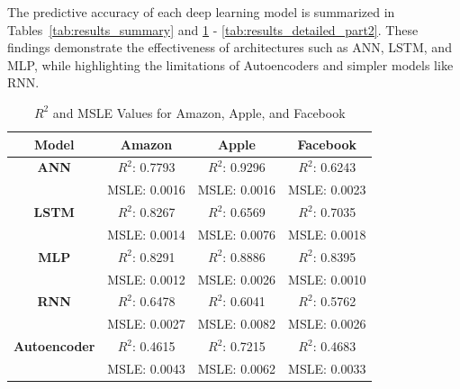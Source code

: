 \documentclass[conference]{IEEEtran}
\begin{document}
The predictive accuracy of each deep learning model is summarized in Tables~\ref{tab:results_summary} and \ref{tab:results_detailed_part1} - \ref{tab:results_detailed_part2}. These findings demonstrate the effectiveness of architectures such as ANN, LSTM, and MLP, while highlighting the limitations of Autoencoders and simpler models like RNN.

\begin{table}[h!]
\centering
\caption{$R^2$ and MSLE Values for Amazon, Apple, and Facebook}
\label{tab:results_detailed_part1}
\begin{tabular}{|c|c|c|c|}
\hline
\textbf{Model}      & \textbf{Amazon}            & \textbf{Apple}             & \textbf{Facebook}          \\ \hline
\textbf{ANN}        & $R^2$: 0.7793             & $R^2$: 0.9296             & $R^2$: 0.6243             \\ 
                    & MSLE: 0.0016              & MSLE: 0.0016              & MSLE: 0.0023              \\ \hline
\textbf{LSTM}       & $R^2$: 0.8267             & $R^2$: 0.6569             & $R^2$: 0.7035             \\ 
                    & MSLE: 0.0014              & MSLE: 0.0076              & MSLE: 0.0018              \\ \hline
\textbf{MLP}        & $R^2$: 0.8291             & $R^2$: 0.8886             & $R^2$: 0.8395             \\ 
                    & MSLE: 0.0012              & MSLE: 0.0026              & MSLE: 0.0010              \\ \hline
\textbf{RNN}        & $R^2$: 0.6478             & $R^2$: 0.6041             & $R^2$: 0.5762             \\ 
                    & MSLE: 0.0027              & MSLE: 0.0082              & MSLE: 0.0026              \\ \hline
\textbf{Autoencoder} & $R^2$: 0.4615            & $R^2$: 0.7215             & $R^2$: 0.4683             \\ 
                    & MSLE: 0.0043              & MSLE: 0.0062              & MSLE: 0.0033              \\ \hline
\end{tabular}
\end{table}
\end{document}
